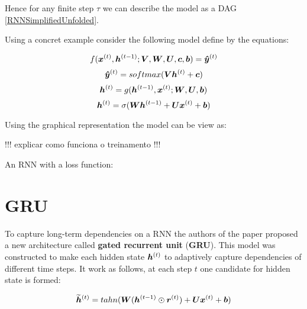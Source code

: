 Hence for any finite step $\tau$ we can describe the model as a DAG \ref{RNNSimplifiedUnfolded}.



Using a concret example consider the following model define by the equations:

\begin{equation}
f(\bm{x}^{(t)}, \bm{h}^{(t-1)}; \bm{V}, \bm{W}, \bm{U}, \bm{c}, \bm{b}) = \bm{\hat{y}}^{(t)}
\end{equation}
 \vspace{0.2cm}
\begin{equation}
\bm{\hat{y}}^{(t)} = softmax(\bm{V} \bm{h}^{(t)} + \bm{c})
\end{equation}
\vspace{0.2cm}
 \begin{equation}
\bm{h}^{(t)} = g(\bm{h}^{(t-1)}, \bm{x}^{(t)}; \bm{W},\bm{U}, \bm{b})
\end{equation}
\vspace{0.2cm}
\begin{equation}
\bm{h}^{(t)} = \sigma(\bm{W} \bm{h}^{(t-1)} + \bm{U} \bm{x}^{(t)} + \bm{b})
\end{equation}

Using the graphical representation the model can be view as:

 

!!! explicar como funciona o treinamento !!!

An RNN with a loss function:




\section{GRU}


To capture long-term dependencies on a RNN  the authors of the paper \cite{ChungGCB14}  proposed a new architecture called \textbf{gated recurrent unit} (\textbf{GRU}). This model was constructed to make each hidden state  $\bm{h}^{(t)}$ to adaptively capture dependencies of different time steps. It work as follows, at each step $t$ one candidate for hidden state is formed:

\begin{equation}
\bm{\widetilde{h}}^{(t)} = tahn(\bm{W} (\bm{h}^{(t-1)} \odot  \bm{r}^{(t)}) + \bm{U} \bm{x}^{(t)} + \bm{b})
\end{equation}


